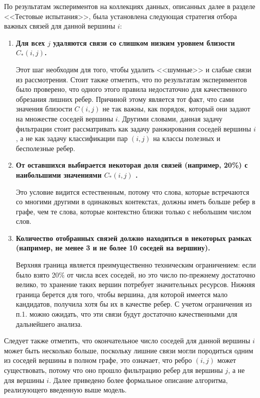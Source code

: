 По результатам экспериментов на коллекциях данных, описанных далее в разделе <<Тестовые испытания>>, была установлена следующая стратегия отбора важных связей для данной вершины $i$:
\begin{enumerate}
    \item \textbf{Для всех $j$ удаляются связи со слишком низким уровнем близости $C_{*}(i,j)$.}

    Этот шаг необходим для того, чтобы удалить <<шумные>> и слабые связи из рассмотрения. Стоит также отметить, что по результатам экспериментов было проверено, что одного этого правила недостаточно для качественного обрезания лишних ребер. Причиной этому является тот факт, что сами значения близости $C(i,j)$ не так важны, как порядок, который они задают на множестве соседей вершины $i$.  Другими словами, данная задачу фильтрации стоит рассматривать как задачу ранжирования соседей вершины $i$ , а не как задачу классификации пар $(i, j)$ на классы полезных и бесполезные ребер.
    \item \textbf{От оставшихся выбирается некоторая доля связей (например, 20\%) с наибольшими значениями $C_{*}(i,j)$ .}

    Это условие видится естественным, потому что слова, которые встречаются со многими другими в одинаковых контекстах, должны иметь больше ребер в графе, чем те слова, которые контекстно близки только с небольшим числом слов.

    \item \textbf{Количество отобранных связей должно находиться в некоторых рамках (например, не менее 3 и не более 10 соседей на вершину).}

    Верхняя граница является преимущественно техническим ограничением: если было взято 20\% от числа всех соседей, но это число по-прежнему достаточно велико, то хранение таких вершин потребует значительных ресурсов. Нижняя граница берется для того, чтобы вершина, для которой имеется мало кандидатов, получила хотя бы их в качестве ребер. С учетом ограничения из п.1. можно ожидать, что эти связи будут достаточно качественными для дальнейшего анализа.
\end{enumerate}

Следует также отметить, что окончательное число соседей для данной вершины $i$ может быть несколько больше, поскольку лишние связи могли породиться одним из соседей вершины в полном графе, это означает, что ребро $(i,j)$ может существовать, потому что оно прошло фильтрацию ребер для вершины $j$, а не для вершины $i$. Далее приведено более формальное описание алгоритма, реализующего введенную выше модель.

